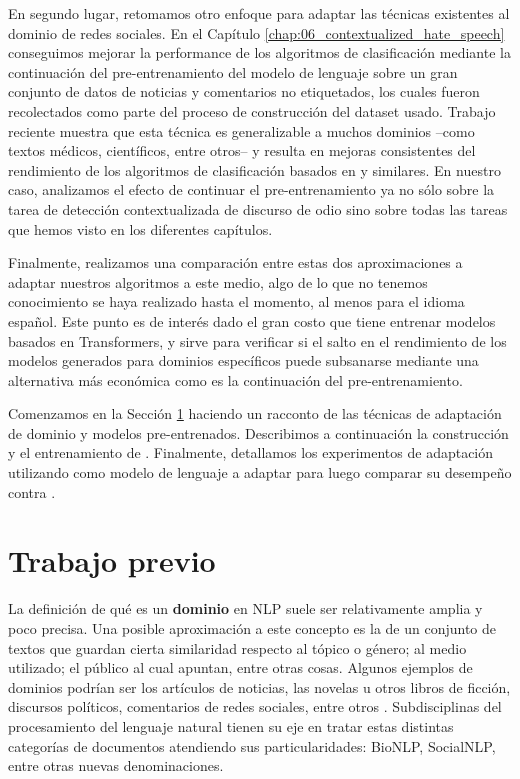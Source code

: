 En segundo lugar, retomamos otro enfoque para adaptar las técnicas existentes al dominio de redes sociales. En el Capítulo \ref{chap:06_contextualized_hate_speech} conseguimos mejorar la performance de los algoritmos de clasificación mediante la continuación del pre-entrenamiento del modelo de lenguaje sobre un gran conjunto de datos de noticias y comentarios no etiquetados, los cuales fueron recolectados como parte del proceso de construcción del dataset usado. Trabajo reciente muestra que esta técnica es generalizable a muchos dominios --como textos médicos, científicos, entre otros-- y resulta en mejoras consistentes del rendimiento de los algoritmos de clasificación basados en \bert{} y similares. En nuestro caso, analizamos el efecto de continuar el pre-entrenamiento ya no sólo sobre la tarea de detección contextualizada de discurso de odio sino sobre todas las tareas que hemos visto en los diferentes capítulos.

Finalmente, realizamos una comparación entre estas dos aproximaciones a adaptar nuestros algoritmos a este medio, algo de lo que no tenemos conocimiento se haya realizado hasta el momento, al menos para el idioma español. Este punto es de interés dado el gran costo que tiene entrenar modelos basados en Transformers, y sirve para verificar si el salto en el rendimiento de los modelos generados para dominios específicos puede subsanarse mediante una alternativa más económica como es la continuación del pre-entrenamiento.

Comenzamos en la Sección \ref{sec:domain_adaptation_previous_work} haciendo un racconto de las técnicas de adaptación de dominio y modelos pre-entrenados. Describimos a continuación la  construcción y el entrenamiento de \robertuito{} \cite{perez2021robertuito}. Finalmente, detallamos los experimentos de adaptación utilizando \beto{} como modelo de lenguaje a adaptar para luego comparar su desempeño contra \robertuito{}.

\section{Trabajo previo}
\label{sec:domain_adaptation_previous_work}

La definición de qué es un \textbf{dominio} en NLP suele ser relativamente amplia y poco precisa. Una posible aproximación a este concepto es la de un conjunto de textos que guardan cierta similaridad respecto al tópico o género; al medio utilizado; el público al cual apuntan, entre otras cosas. Algunos ejemplos de dominios podrían ser los artículos de noticias, las novelas u otros libros de ficción, discursos políticos, comentarios de redes sociales, entre otros \cite{gururangan-etal-2020-dont}. Subdisciplinas del procesamiento del lenguaje natural tienen su eje en tratar estas distintas categorías de documentos atendiendo sus particularidades: BioNLP, SocialNLP, entre otras nuevas denominaciones.

